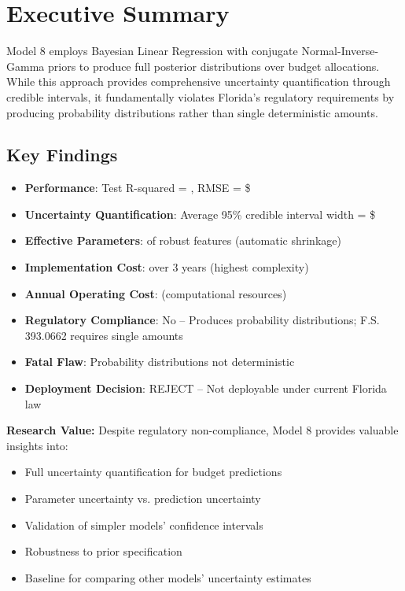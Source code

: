 
\section{Executive Summary}

Model 8 employs Bayesian Linear Regression with conjugate Normal-Inverse-Gamma priors to produce full posterior distributions over budget allocations. While this approach provides comprehensive uncertainty quantification through credible intervals, it fundamentally violates Florida's regulatory requirements by producing probability distributions rather than single deterministic amounts.

\subsection{Key Findings}

\begin{itemize}
    \item \textbf{Performance}: Test R-squared = \ModelEightRSquaredTest{}, RMSE = \$\ModelEightRMSETest{}
    \item \textbf{Uncertainty Quantification}: Average 95\% credible interval width = \$\ModelEightAvgCredibleWidth{}
    \item \textbf{Effective Parameters}: \ModelEightEffectiveParams{} of \ModelEightNRobustFeatures{} robust features (automatic shrinkage)
    \item \textbf{Implementation Cost}: \ModelEightThreeYearTCO{} over 3 years (highest complexity)
    \item \textbf{Annual Operating Cost}: \ModelEightAnnualCost{} (computational resources)
    \item \textbf{Regulatory Compliance}: No -- Produces probability distributions; F.S. 393.0662 requires single amounts
    \item \textbf{Fatal Flaw}: Probability distributions not deterministic
    \item \textbf{Deployment Decision}: REJECT -- Not deployable under current Florida law
\end{itemize}

\textbf{Research Value:} Despite regulatory non-compliance, Model 8 provides valuable insights into:
\begin{itemize}
    \item Full uncertainty quantification for budget predictions
    \item Parameter uncertainty vs. prediction uncertainty
    \item Validation of simpler models' confidence intervals
    \item Robustness to prior specification
    \item Baseline for comparing other models' uncertainty estimates
\end{itemize}

